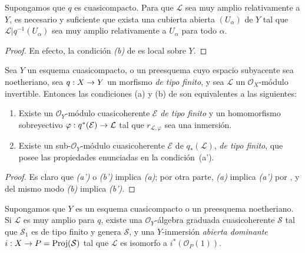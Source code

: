 \documentclass[oneside,10pt]{amsart}
\makeatletter
\newcommand{\ega@arrow}[2]{\mathchoice{#1}{#2}{#2}{#2}}
\renewcommand{\to}{\ega@arrow{\longrightarrow}{\rightarrow}}
\let\EGAOriginalLabel\label
\renewcommand{\label}[1]{\phantomsection\EGAOriginalLabel{#1}}
\makeatother
\begin{document}
\begin{corollary}[4.4.5]
\label{II.4.4.5-fr}
Supongamos que $q$ es cuasicompacto.
Para que $\mathcal{L}$ sea muy amplio relativamente a $Y$, es necesario y suficiente que exista una cubierta abierta $(U_\alpha)$ de $Y$ tal que $\mathcal{L}|q^{-1}(U_\alpha)$ sea muy amplio relativamente a $U_\alpha$ para todo $\alpha$.
\end{corollary}

\begin{proof}
En efecto, la condición \emph{(b)} de  es local sobre $Y$.
\end{proof}

\begin{proposition}[4.4.6]
\label{II.4.4.6-fr}
Sea $Y$ un esquema cuasicompacto, o un preesquema cuyo espacio subyacente sea noetheriano, sea $q:X\to Y$ un morfismo \emph{de tipo finito}, y sea $\mathcal{L}$ un $\mathcal{O}_X$-módulo invertible.
Entonces las condiciones \textup{(a)} y \textup{(b)} de  son equivalentes a las siguientes:
\begin{enumerate}
  \item[\rm{(a')}] Existe un $\mathcal{O}_Y$-módulo cuasicoherente $\mathcal{E}$ \emph{de tipo finito} y un homomorfismo sobreyectivo $\varphi:q^*(\mathcal{E})\to\mathcal{L}$ tal que $r_{\mathcal{L},\varphi}$ sea una inmersión.
  \item[\rm{(b')}] Existe un sub-$\mathcal{O}_Y$-módulo cuasicoherente $\mathcal{E}$ de $q_*(\mathcal{L})$, \emph{de tipo finito}, que posee las propiedades enunciadas en la condición~\textup{(a')}.
\end{enumerate}
\end{proposition}

\begin{proof}
Es claro que \emph{(a')} o \emph{(b')} implica \emph{(a)};
por otra parte, \emph{(a)} implica \emph{(a')} por , y del mismo modo \emph{(b)} implica \emph{(b')}.
\end{proof}

\begin{corollary}[4.4.7]
\label{II.4.4.7-fr}
Supongamos que $Y$ es un esquema cuasicompacto o un preesquema noetheriano.
Si $\mathcal{L}$ es muy amplio para $q$, existe una $\mathcal{O}_Y$-álgebra graduada cuasicoherente $\mathcal{S}$ tal que $\mathcal{S}_1$ es de tipo finito y genera $\mathcal{S}$, y una $Y$-inmersión \emph{abierta dominante} $i:X\to P=\operatorname{Proj}(\mathcal{S})$ tal que $\mathcal{L}$ es isomorfo a $i^*(\mathcal{O}_P(1))$.
\end{corollary}
\end{document}
